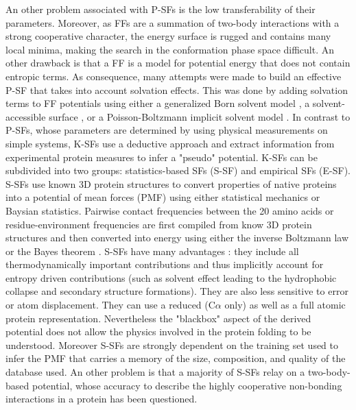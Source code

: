 \documentclass[a4paper,20pt,notitlepage,openbib]{article}
\begin{document}
An other problem associated with P-SFs is the low transferability of their parameters. Moreover, as FFs are a summation of two-body interactions 
with a strong cooperative character, the energy surface is rugged and contains many local minima, making the search in the conformation
phase space difficult. An other drawback is that a FF is a model for potential energy that does not contain entropic terms.
As consequence, many attempts were made to build an effective P-SF that takes into account solvation effects. This was done
by adding solvation terms to FF potentials using either a generalized Born solvent model \cite{Felts:OPLSsgb, Lee:CHARMMmdgb},
 a solvent-accessible surface \cite{Zhu:gromos96gbsa}, or a Poisson-Boltzmann implicit solvent model \cite{Luo:Amberpb}.
In contrast to P-SFs, whose parameters are determined by using physical measurements on simple systems, K-SFs use a deductive
approach and extract information from experimental protein measures to infer a "pseudo" potential. K-SFs can be subdivided into
two groups: statistics-based SFs (S-SF) and empirical SFs (E-SF).
S-SFs use known 3D protein structures to convert properties of native proteins into a potential of mean forces
(PMF) using either statistical mechanics  or Baysian statistics. Pairwise contact frequencies between the 20 amino acids
\cite{jernigan:pmf01, jernigan:pmf02, sippl:pmf01, moult:pmf01} or residue-environment frequencies \cite{simons:paper01,bowie:profile}
are first compiled from know 3D protein structures and then converted into energy using either the inverse Boltzmann
law \cite{sippl:pmf01, jernigan:pmf01, jernigan:pmf02} or the Bayes theorem  \cite{moult:pmf01}. S-SFs have many advantages :
they include all thermodynamically important contributions and thus implicitly account for entropy driven contributions (such as solvent
effect leading to the hydrophobic collapse and secondary structure formations). They are also less sensitive to error or atom displacement.
They can use a reduced (C$\alpha$ only) as well as a full atomic protein representation. Nevertheless the "blackbox" aspect of the
derived potential does not allow the physics involved in the protein folding to be understood. Moreover S-SFs are strongly
dependent on the training set used to infer the PMF that carries a memory of the size, composition, and quality of the database used.
An other problem is that a majority of S-SFs relay on a two-body-based potential, whose accuracy to describe the highly cooperative
non-bonding interactions in a protein has been questioned.
\end{document}
